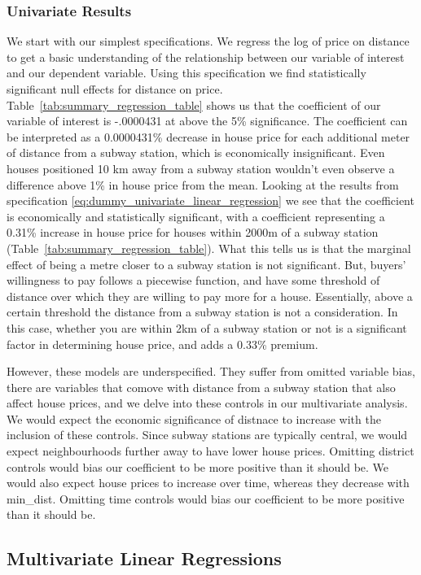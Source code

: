 \subsubsection{Univariate Results}
We start with our simplest specifications. We regress the log of price on distance to get a basic understanding of the 
relationship between our variable of interest and our dependent variable. 
Using this specification we find statistically significant null effects for distance on price. 
Table~\ref{tab:summary_regression_table} shows us that the coefficient of our variable of interest is -.0000431 at above the 5\% significance.
The coefficient can be interpreted as a 0.0000431\% decrease in house price for each additional meter of distance from a subway station, which is economically insignificant.
 Even houses positioned 10 km away from a subway station wouldn't even observe a difference above 1\% in house price from the mean.
Looking at the results from specification \ref{eq:dummy_univariate_linear_regression} we see that the coefficient is economically and statistically significant,
with a coefficient representing a 0.31\% increase in house price for houses within 2000m of a subway station (Table~\ref{tab:summary_regression_table}).
What this tells us is that the marginal effect of being a metre closer to a subway station is not significant. But, buyers' willingness to pay follows a piecewise function, and have some threshold of distance over which
they are willing to pay more for a house. Essentially, above a certain threshold the distance from a subway station is not a consideration.
In this case, whether you are within 2km of a subway station or not is a significant factor in determining house price, and adds a 0.33\% premium.

However, these models are underspecified. They suffer from omitted variable bias, there are variables that comove with distance from a subway station that also affect house prices, and we delve into these
controls in our multivariate analysis. We would expect the economic significance of distnace to increase with the inclusion of these controls.
Since subway stations are typically central, we would expect neighbourhoods further away to have lower house prices. Omitting 
district controls would bias our coefficient to be more positive than it should be. We would also expect house prices to increase over time, whereas they decrease with min\_dist. Omitting time controls would bias our coefficient to be more 
positive than it should be.
\subsection{Multivariate Linear Regressions}

